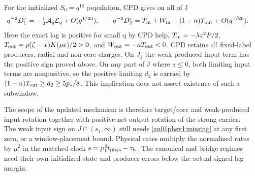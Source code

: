 \documentclass[11pt]{article}
\begin{document}
For the initialized \(S_0=q^{10}\) population, CPD gives on all of J
\[
 q^{-2}D_1^\tau=-\tfrac12\mathcal A_q\mathcal L_q+O(q^{1/20}),\qquad
 q^{-2}D_2^\tau=T_{\rm in}+W_{\rm in}+(1-n)T_{\rm out}
                   +O(q^{1/20}).
\]
Here the exact lag is positive for small q by CPD help,
\(T_{\rm in}=-\lambda z^2P/2\),
\(T_{\rm out}=\rho(\zeta-x)K(\rho x)/2>0\), and
\(W_{\rm out}=-nT_{\rm out}<0\).
CPD retains all fixed-label producers, radial and non-core charges.
On \(J_1\) the weak-produced input term has the positive sign proved
above. On any part of J where \(z\le0\), both limiting input terms
are nonpositive, so the positive limiting \(d_2\) is carried by
\((1-n)T_{\rm out}\ge d_2\ge5p_*/8\). This implication does not
assert existence of such a subwindow.

The scope of the updated mechanism is therefore target/core and
weak-produced input rotation together with positive net output rotation
of the strong carrier. The weak input sign on \(J\cap(s_1,\infty)\)
still needs \eqref{an01phsv1:missing} at any first zero, or a
window-placement bound. Physical rates multiply the normalized rates
by \(\mu_1^2\) in the matched clock \(s=\mu_1^2t_{\rm phys}-\tau_h\).
The canonical and bridge regimes need their own initialized state
and producer errors below the actual signed lag margin.
\end{document}
